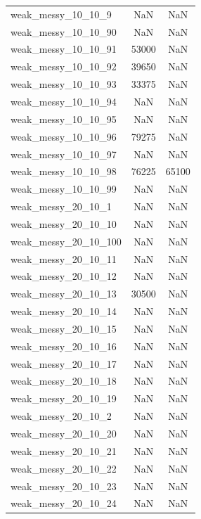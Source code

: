\begin{longtable}{lcc}
weak\_messy\_10\_10\_9     &      NaN &    NaN \\
weak\_messy\_10\_10\_90    &      NaN &    NaN \\
weak\_messy\_10\_10\_91    &    53000 &    NaN \\
weak\_messy\_10\_10\_92    &    39650 &    NaN \\
weak\_messy\_10\_10\_93    &    33375 &    NaN \\
weak\_messy\_10\_10\_94    &      NaN &    NaN \\
weak\_messy\_10\_10\_95    &      NaN &    NaN \\
weak\_messy\_10\_10\_96    &    79275 &    NaN \\
weak\_messy\_10\_10\_97    &      NaN &    NaN \\
weak\_messy\_10\_10\_98    &    76225 &  65100 \\
weak\_messy\_10\_10\_99    &      NaN &    NaN \\
weak\_messy\_20\_10\_1     &      NaN &    NaN \\
weak\_messy\_20\_10\_10    &      NaN &    NaN \\
weak\_messy\_20\_10\_100   &      NaN &    NaN \\
weak\_messy\_20\_10\_11    &      NaN &    NaN \\
weak\_messy\_20\_10\_12    &      NaN &    NaN \\
weak\_messy\_20\_10\_13    &    30500 &    NaN \\
weak\_messy\_20\_10\_14    &      NaN &    NaN \\
weak\_messy\_20\_10\_15    &      NaN &    NaN \\
weak\_messy\_20\_10\_16    &      NaN &    NaN \\
weak\_messy\_20\_10\_17    &      NaN &    NaN \\
weak\_messy\_20\_10\_18    &      NaN &    NaN \\
weak\_messy\_20\_10\_19    &      NaN &    NaN \\
weak\_messy\_20\_10\_2     &      NaN &    NaN \\
weak\_messy\_20\_10\_20    &      NaN &    NaN \\
weak\_messy\_20\_10\_21    &      NaN &    NaN \\
weak\_messy\_20\_10\_22    &      NaN &    NaN \\
weak\_messy\_20\_10\_23    &      NaN &    NaN \\
weak\_messy\_20\_10\_24    &      NaN &    NaN \\

\end{longtable}
